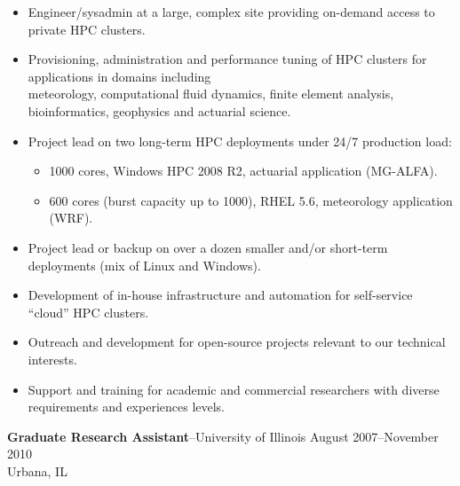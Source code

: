 \documentclass[10pt]{article}
\newcommand{\jobitem}[4]{
    \vspace{2pt}

    \textbf{#1}--#2 \hfill #3\\ #4

    \vspace{-8pt}
}
\begin{document}
\begin{itemize}\setlength{\itemsep}{0cm}
  \setlength{\parskip}{0cm}

\item Engineer/sysadmin at a large, complex site providing on-demand access to private HPC clusters.
\item Provisioning, administration and performance tuning of HPC clusters for applications in domains including \\
meteorology, computational fluid dynamics, finite element analysis, bioinformatics, geophysics and actuarial science.
\item Project lead on two long-term HPC deployments under 24/7 production load:
\begin{itemize}\setlength{\itemsep}{0cm}
\setlength{\parskip}{0cm}
\vspace{-4pt}
\item 1000 cores, Windows HPC 2008 R2, actuarial application (MG-ALFA).
\item 600 cores (burst capacity up to 1000), RHEL 5.6, meteorology application (WRF).
\end{itemize}
\vspace{-4pt}
\item Project lead or backup on over a dozen smaller and/or short-term deployments (mix of Linux and Windows).
\item Development of in-house infrastructure and automation for self-service ``cloud'' HPC clusters.
\item Outreach and development for open-source projects relevant to our technical interests.
\item Support and training for academic and commercial researchers with diverse requirements and experiences levels.

\end{itemize}


\vspace{-6pt}
\jobitem{Graduate Research Assistant}{University of Illinois}{August 2007--November 2010}{Urbana, IL}
\end{document}
